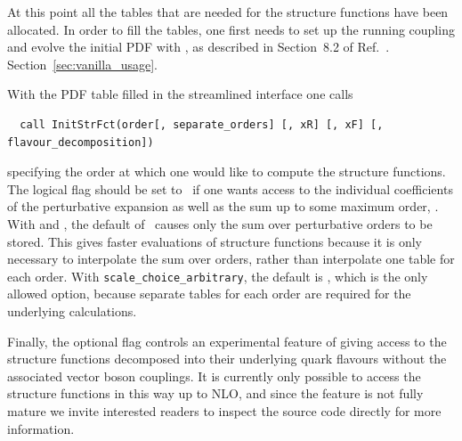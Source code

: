 At this point all the tables that are needed for the structure
functions have been allocated.
%
In order to fill the tables, one first needs to set up the running
coupling and evolve the initial PDF with , as
described in
\ifreleasenote
Section~8.2 of Ref.~\cite{Salam:2008qg}.
\else
Section~\ref{sec:vanilla_usage}.
\fi

%
%
With the PDF table filled in the streamlined interface one calls
\begin{lstlisting}
  call InitStrFct(order[, separate_orders] [, xR] [, xF] [, flavour_decomposition])
\end{lstlisting}
specifying the order at which one would like to compute the structure
functions.
%
The logical flag  should be set to \ if one
wants access to the individual coefficients of the perturbative
expansion as well as the sum up to some maximum order, .
%
With  and , the
default of \ causes only the sum over perturbative orders
to be stored.
%
This gives faster evaluations of structure functions because it is
only necessary to interpolate the sum over orders, rather than
interpolate one table for each order.
%
With \texttt{scale\_choice\_arbitrary}, the default is ,
which is the only allowed option, because separate tables for each
order are required for the underlying calculations.

Finally, the optional flag  controls an
experimental feature of giving access to the structure functions
decomposed into their underlying quark flavours without the associated
vector boson couplings. It is currently only possible to access the
structure functions in this way up to NLO, and since the feature is
not fully mature we invite interested readers to inspect the source
code directly for more information.

